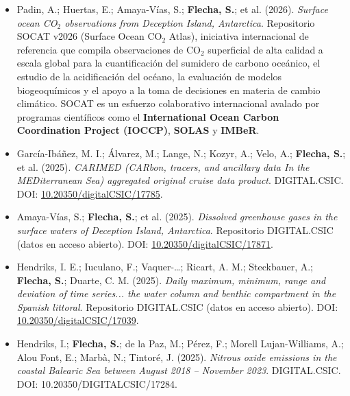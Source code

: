 \documentclass[11pt,a4paper]{article}
\begin{document}
\begin{itemize}[leftmargin=*]

\item Padin, A.; Huertas, E.; Amaya-Vías, S.; \textbf{Flecha, S.}; et al. (2026).
\textit{Surface ocean CO$_2$ observations from Deception Island, Antarctica}.
Repositorio SOCAT v2026 (Surface Ocean CO$_2$ Atlas), iniciativa internacional de referencia que compila observaciones de CO$_2$ superficial de alta calidad a escala global para la cuantificación del sumidero de carbono oceánico, el estudio de la acidificación del océano, la evaluación de modelos biogeoquímicos y el apoyo a la toma de decisiones en materia de cambio climático. SOCAT es un esfuerzo colaborativo internacional avalado por programas científicos como el \textbf{International Ocean Carbon Coordination Project (IOCCP)}, \textbf{SOLAS} y \textbf{IMBeR}.


    \item García-Ibáñez, M. I.; Álvarez, M.; Lange, N.; Kozyr, A.; Velo, A.; \textbf{Flecha, S.}; et al. (2025).
    \textit{CARIMED (CARbon, tracers, and ancillary data In the MEDiterranean Sea) aggregated original cruise data product}.
    DIGITAL.CSIC.
    DOI: \href{https://digital.csic.es/handle/10261/408914}{10.20350/digitalCSIC/17785}.

    \item Amaya-Vías, S.;  \textbf{Flecha, S.}; et al. (2025).
    \textit{Dissolved greenhouse gases in the surface waters of Deception Island, Antarctica}.
    Repositorio DIGITAL.CSIC (datos en acceso abierto).
    DOI: \href{https://digital.csic.es/handle/10261/412717}{10.20350/digitalCSIC/17871}.

    \item Hendriks, I. E.; Iuculano, F.; Vaquer-…; Ricart, A. M.; Steckbauer, A.;  \textbf{Flecha, S.}; Duarte, C. M. (2025).
    \textit{Daily maximum, minimum, range and deviation of time series... the water column and benthic compartment in the Spanish littoral}.
    Repositorio DIGITAL.CSIC (datos en acceso abierto).
    DOI: \href{https://doi.org/10.20350/digitalCSIC/17039}{10.20350/digitalCSIC/17039}.

    \item Hendriks, I.; \textbf{Flecha, S.}; de la Paz, M.; Pérez, F.; Morell Lujan-Williams, A.; Alou Font, E.; Marbà, N.; Tintoré, J. (2025). 
    \textit{Nitrous oxide emissions in the coastal Balearic Sea between August 2018 – November 2023}. 
    DIGITAL.CSIC. DOI: 10.20350/DIGITALCSIC/17284.


\end{itemize}
\end{document}
